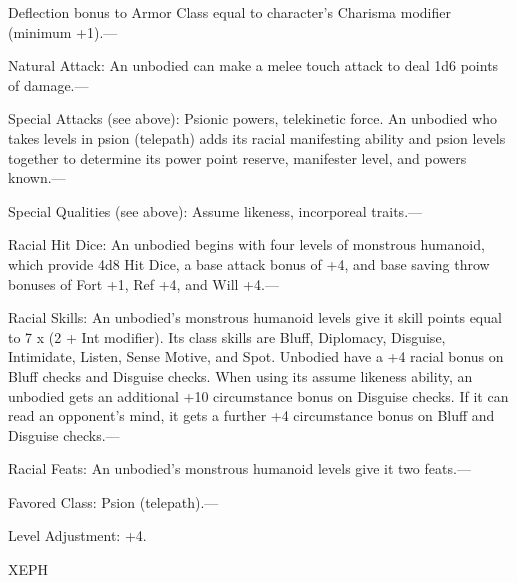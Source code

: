 \documentclass{article}
\begin{document}
Deflection bonus to Armor Class equal to character's Charisma modifier (minimum 
+1).---

Natural Attack: An unbodied can make a melee touch attack to deal 1d6 points of 
damage.---

Special Attacks (see above): Psionic powers, telekinetic force. An unbodied who 
takes levels in psion (telepath) adds its racial manifesting ability and psion 
levels together to determine its power point reserve, manifester level, and powers 
known.---

Special Qualities (see above): Assume likeness, incorporeal traits.---

Racial Hit Dice: An unbodied begins with four levels of monstrous humanoid, which 
provide 4d8 Hit Dice, a base attack bonus of +4, and base saving throw bonuses 
of Fort +1, Ref +4, and Will +4.---

Racial Skills: An unbodied's monstrous humanoid levels give it skill points equal 
to 7 x (2 + Int modifier). Its class skills are Bluff, Diplomacy, Disguise, Intimidate, 
Listen, Sense Motive, and Spot. Unbodied have a +4 racial bonus on Bluff checks 
and Disguise checks. When using its assume likeness ability, an unbodied gets an 
additional +10 circumstance bonus on Disguise checks. If it can read an opponent's 
mind, it gets a further +4 circumstance bonus on Bluff and Disguise checks.---

Racial Feats: An unbodied's monstrous humanoid levels give it two feats.---

Favored Class: Psion (telepath).---

Level Adjustment: +4.

\vspace{12pt}
{\LARGE{}XEPH}
\end{document}
